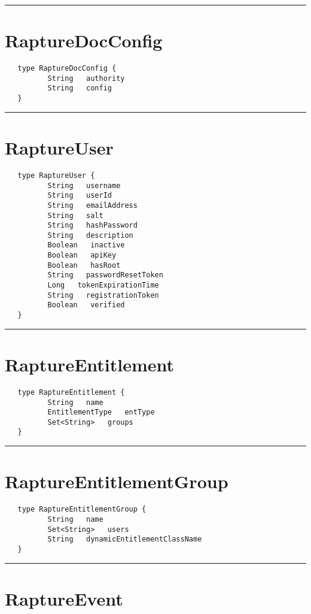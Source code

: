 \rule{15cm}{2pt}
\section{RaptureDocConfig}
\label{type:RaptureDocConfig}

\begin{verbatim}
   type RaptureDocConfig {
          String   authority
          String   config
   }
\end{verbatim}

\rule{15cm}{2pt}
\section{RaptureUser}
\label{type:RaptureUser}

\begin{verbatim}
   type RaptureUser {
          String   username
          String   userId
          String   emailAddress
          String   salt
          String   hashPassword
          String   description
          Boolean   inactive
          Boolean   apiKey
          Boolean   hasRoot
          String   passwordResetToken
          Long   tokenExpirationTime
          String   registrationToken
          Boolean   verified
   }
\end{verbatim}

\rule{15cm}{2pt}
\section{RaptureEntitlement}
\label{type:RaptureEntitlement}

\begin{verbatim}
   type RaptureEntitlement {
          String   name
          EntitlementType   entType
          Set<String>   groups
   }
\end{verbatim}

\rule{15cm}{2pt}
\section{RaptureEntitlementGroup}
\label{type:RaptureEntitlementGroup}

\begin{verbatim}
   type RaptureEntitlementGroup {
          String   name
          Set<String>   users
          String   dynamicEntitlementClassName
   }
\end{verbatim}

\rule{15cm}{2pt}
\section{RaptureEvent}
\label{type:RaptureEvent}

